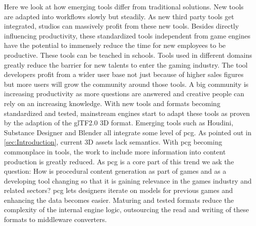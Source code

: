 \documentclass[10pt,a4paper]{article}
\begin{document}
\begin{multicols}{2}
Here we look at how emerging tools differ from traditional solutions. New tools are adapted into workflows slowly but steadily. As new third party tools get integrated, studios can massively profit from these new tools. Besides directly influencing productivity, these standardized tools independent from game engines have the potential to immensely reduce the time for new employees to be productive. These tools can be teached in schools. Tools used in different domains greatly reduce the barrier for new talents to enter the gaming industry. The tool developers profit from a wider user base not just because of higher sales figures but more users will grow the community around those tools. A big community is increasing productivity as more questions are answered and creative people can rely on an increasing knowledge. With new tools and formats becoming standardized and tested, mainstream engines start to adapt these tools as proven by the adaption of the glTF2.0 3D format\cite{Group2018}. Emerging tools such as Houdini, Substance Designer and Blender all integrate some level of \gls{pcg}. As pointed out in \autoref{sec:Introduction}, current 3D assets lack semantics. With \gls{pcg} becoming commonplace in tools, the work to include more information into content production is greatly reduced. As \gls{pcg} is a core part of this trend we ask the question: How is procedural content generation as part of games and as a developing tool changing so that it is gaining relevance in the games industry and related sectors? \gls{pcg} lets designers iterate on models for previous games and enhancing the data becomes easier. Maturing and tested formats reduce the complexity of the internal engine logic, outsourcing the read and writing of these formats to middleware converters.
\end{multicols}
\end{document}
